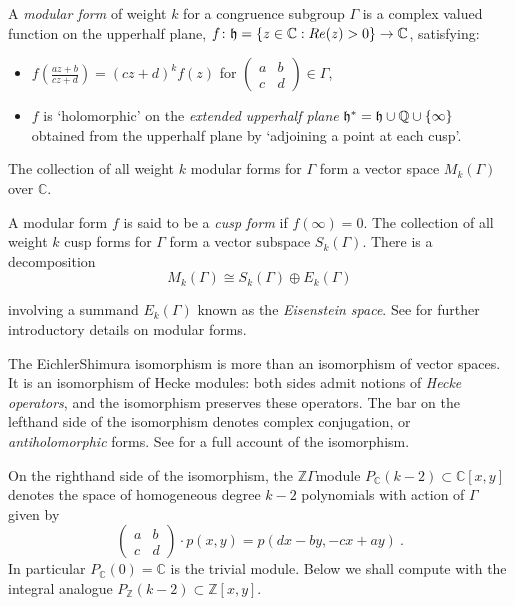 \documentclass[a4paper,11pt]{report}
\begin{document}
{{A \emph{modular form} of weight $k$ for a congruence subgroup $\Gamma$ is a complex valued function on the upper\texttt{}half plane, $f\colon {\frak{h}}=\{z\in \mathbb C : Re(z)>0\} \rightarrow \mathbb C$, satisfying: 
\begin{itemize}
\item  $\displaystyle f(\frac{az+b}{cz+d}) = (cz+d)^k f(z)$ for $\left(\begin{array}{ll}a&b\\ c &d \end{array}\right) \in \Gamma$, 
\item  $f$ is `holomorphic' on the \emph{extended upper\texttt{}half plane} $\frak{h}^\ast = \frak{h} \cup \mathbb Q \cup \{\infty\}$ obtained from the upper\texttt{}half plane by `adjoining a point at
each cusp'. 
\end{itemize}
 The collection of all weight $k$ modular forms for $\Gamma$ form a vector space $M_k(\Gamma)$ over $\mathbb C$. 

A modular form $f$ is said to be a \emph{cusp form} if $f(\infty)=0$. The collection of all weight $k$ cusp forms for $\Gamma$ form a vector subspace $S_k(\Gamma)$. There is a decomposition 
\[M_k(\Gamma) \cong S_k(\Gamma) \oplus E_k(\Gamma)\]
 

 involving a summand $E_k(\Gamma)$ known as the \emph{Eisenstein space}. See \cite{stein} for further introductory details on modular forms. 

The Eichler\texttt{}Shimura isomorphism is more than an isomorphism
of vector spaces. It is an isomorphism of Hecke modules: both sides admit
notions of \emph{Hecke operators}, and the isomorphism preserves these operators. The bar on the
left\texttt{}hand side of the isomorphism denotes complex
conjugation, or \emph{anti\texttt{}holomorphic} forms. See \cite{wieser} for a full account of the isomorphism. 



 On the right\texttt{}hand side of the isomorphism, the $\mathbb Z\Gamma$\texttt{}module $P_{\mathbb C}(k-2)\subset \mathbb C[x,y]$ denotes the space of homogeneous degree $k-2$ polynomials with action of $\Gamma$ given by 
\[\left(\begin{array}{ll}a&b\\ c &d \end{array}\right)\cdot p(x,y) =
p(dx-by,-cx+ay)\ .\]
 In particular $P_{\mathbb C}(0)=\mathbb C$ is the trivial module. Below we shall compute with the integral analogue $P_{\mathbb Z}(k-2) \subset \mathbb Z[x,y]$. 



}}
\end{document}

